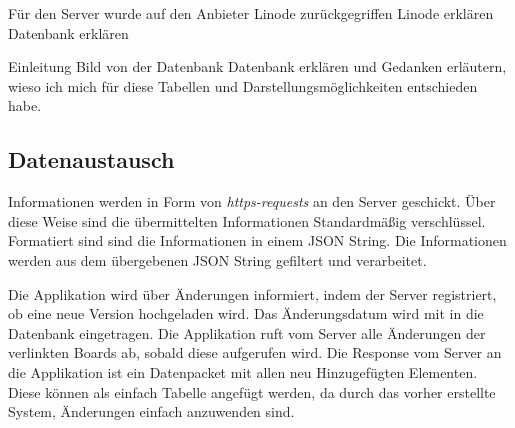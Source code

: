 Für den Server wurde auf den Anbieter Linode zurückgegriffen 
Linode erklären
Datenbank erklären

Einleitung
Bild von der Datenbank
Datenbank erklären und Gedanken erläutern, wieso ich mich für diese Tabellen und Darstellungsmöglichkeiten entschieden habe.

\subsection{Datenaustausch}

Informationen werden in Form von \textit{https-requests} an den Server geschickt. Über diese Weise sind die übermittelten Informationen Standardmäßig verschlüssel. Formatiert sind sind die Informationen in einem JSON String. Die Informationen werden aus dem übergebenen JSON String gefiltert und verarbeitet.

Die Applikation wird über Änderungen informiert, indem der Server registriert, ob eine neue Version hochgeladen wird. Das Änderungsdatum wird mit in die Datenbank eingetragen. Die Applikation ruft vom Server alle Änderungen der verlinkten Boards ab, sobald diese aufgerufen wird. Die Response vom Server an die Applikation ist ein Datenpacket mit allen neu Hinzugefügten Elementen. Diese können als einfach Tabelle angefügt werden, da durch das vorher erstellte System, Änderungen einfach anzuwenden sind.




